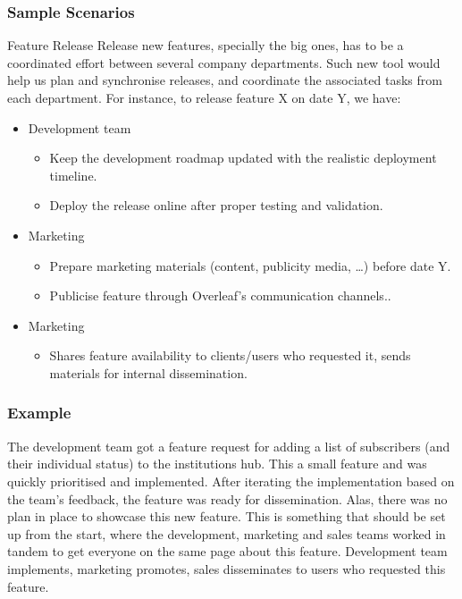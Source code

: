 \documentclass[11pt,a4paper,parskip=half]{scrartcl}
\begin{document}
\subsubsection{Sample Scenarios}
Feature Release
Release new features, specially the big ones, has to be a coordinated effort between several company departments. Such new tool would help us plan and synchronise releases, and coordinate the associated tasks from each department. 
For instance, to release feature X on date Y, we have:
\begin{itemize}
    \item Development team
    \begin{itemize}
        \item Keep the development roadmap updated with the realistic deployment timeline.
        \item Deploy the release online after proper testing and validation.
    \end{itemize}
    \item Marketing
    \begin{itemize}
        \item Prepare marketing materials (content, publicity media, …) before date Y.
        \item Publicise feature through Overleaf’s communication channels..
    \end{itemize}
     \item Marketing
    \begin{itemize}
        \item Shares feature availability to clients/users who requested it, sends materials for internal dissemination.
    \end{itemize}
\end{itemize}{}


\subsubsection{Example}
The development team got a  feature request for adding a list of subscribers (and their individual status) to the institutions hub. This a small feature and was quickly prioritised and implemented. After iterating the implementation based on the team’s feedback, the feature was ready for dissemination. Alas, there was no plan in place to showcase this new feature. This is something that should be set up from the start, where the development, marketing and sales teams worked in tandem to get everyone on the same page about this feature. Development team implements, marketing promotes, sales disseminates to users who requested this feature.
\end{document}
